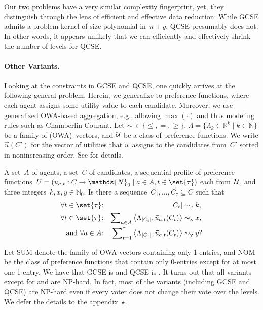 \documentclass[10pt,a4paper,twocolumn]{article}
\theoremstyle{plain}
\theoremstyle{definition}
\theoremstyle{remark}
\newcommand{\prob}[1]{\textnormal{\textsc{#1}}}
\newcommand{\N}{\mathds{N}}
\newcommand{\Nzero}{\mathds{N}_0}
\newcommand{\R}{\mathds{R}}
\newcommand{\cocl}[1]{\textrm{#1}}
\newcommand{\NP}{\cocl{NP}}
\newcommand{\smlaAcr}{\prob{GCSE}}
\newcommand{\fmlaAcr}{\prob{QCSE}}
\newcommand{\appsymb}{$\star$}
\newcommand{\apprefX}[1]{{\hyperref[#1]{\appsymb}}}
\begin{document}
{Our two problems have a very similar complexity fingerprint,
yet, they distinguish through the lens of efficient and effective data reduction:
While
\smlaAcr{} admits a problem kernel of size polynomial in~$n+y$,
\fmlaAcr{} presumably does not.
In other words,
it appears unlikely that we can efficiently and effectively
shrink the number of levels for \fmlaAcr{}.

\paragraph{Other Variants.}
Looking at the constraints in \smlaAcr{} and \fmlaAcr{},
one quickly arrives at the following general problem.
Herein,
we generalize to preference functions, where each agent assigns some utility value to each candidate.
Moreover,
we use generalized OWA-based aggregation, 
e.g.,
allowing $\max(\cdot)$ and thus modeling rules such as Chamberlin-Courant.
Let $\sim\,\in\{\leq,=,\geq\}$,
$\Lambda=\{\Lambda_k \in \R^k \mid k \in \N\}$
be a family of (OWA)~vectors, and
${\cal U}$ be a class of preference functions.
We write $\vec{u} (C')$ for the vector of utilities that $u$~assigns to the candidates from~$C'$
sorted in nonincreasing order.
%
See \citet{BFKKN20} for details.

\newcommand{\vecprod}[2]{\left\langle#1,#2\right\rangle}
%
{A set~$A$ of agents,
a set~$C$ of candidates,
a sequential profile of preference functions~$U=(u_{a,t}: C \rightarrow \Nzero \mid a \in A, t\in\set{\tau})$ each from~$\cal U$,
and three integers~\mbox{$k,x,y\in\Nzero$}.}
{Is there a sequence~$C_1,\dots,C_\tau\subseteq C$
%
such that
\begin{align}
 \text{$\forall t\in\set{\tau}$:} && |C_t| &\sim_{\rm{k}} k, \label{prob:bicmcegen:k}\\
 \text{$\forall t\in\set{\tau}$:} && \sum\nolimits_{a \in A} \vecprod{\Lambda_{|C_t|}}{\vec{u}_{a,t}(C_t)} &\sim_{\rm{x}} x, \label{prob:bicmcegen:x}\\
 \text{and $\forall a\in A$:} && \sum\nolimits_{t=1}^\tau \vecprod{\Lambda_{|C_t|}}{\vec{u}_{a,t}(C_t)} &\sim_{\rm{y}} y?\label{prob:bicmcegen:y}
\end{align}
}

\newcommand{\ourOWA}{SUM}
\newcommand{\ourPREF}{NOM}
\noindent
Let SUM denote the family of OWA-vectors containing only 1-entries,
and NOM be the class of preference functions that contain only 0-entries except for at most one 1-entry.
We have that \smlaAcr{} is \bicmce[$\leq$][$\geq$][$\geq$]{\ourOWA,\ourPREF}
and \fmlaAcr{} is \bicmce[$\leq$][$\geq$][$=$]{\ourOWA,\ourPREF}.
It turns out that all variants except for 
\bicmce[$\leq$][$\leq$][$\leq$]{\ourOWA,\ourPREF}
and
\bicmce[$\geq$][$\geq$][$\geq$]{\ourOWA,\ourPREF} 
are \NP-hard.
In fact,
most of the variants 
(including \smlaAcr{} and \fmlaAcr{})
are \NP-hard even if every voter does not change their vote over the levels.
We defer the details to the appendix~\apprefX{app:sec:epilogue}.

}
\end{document}
